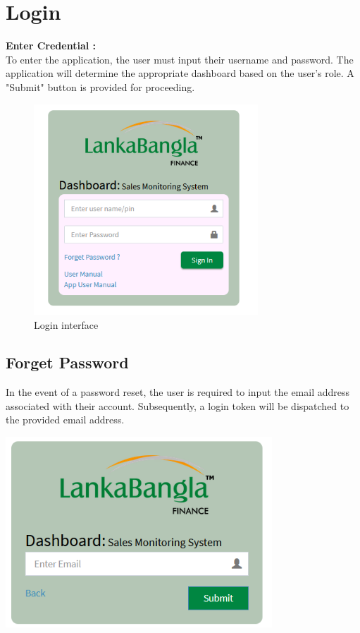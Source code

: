 \documentclass{article}
\begin{document}
\section{Login}
\textbf{Enter Credential :} \\
To enter the application, the user must input their username and password. The application will determine the appropriate dashboard based on the user's role. A "Submit" button is provided for proceeding.
\begin{figure}[h]
    \centering
    \includegraphics[width=0.75\textwidth]{image/user_login_1.png}
    \caption{Login interface}
\end{figure}


\subsection{Forget Password}
In the event of a password reset, the user is required to input the email address associated with their account. Subsequently, a login token will be dispatched to the provided email address.
\begin{center}
    \includegraphics[width=0.75\textwidth]{image/forget_pass_mail_addr.png}
\end{center}
\end{document}

